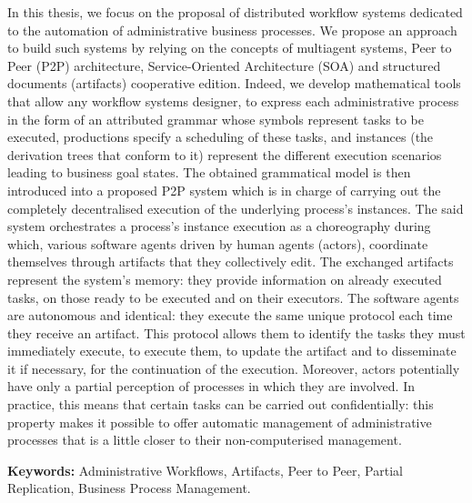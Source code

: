 \let\oldprintchaptertitle=\printchaptertitle
\renewcommand{\printchaptertitle}[1]{%
	\vspace*{-75pt}
	\oldprintchaptertitle{#1}
}%
\let\printchaptertitle=\oldprintchaptertitle
In this thesis, we focus on the proposal of distributed workflow systems dedicated to the automation of administrative business processes. We propose an approach to build such systems by relying on the concepts of multiagent systems, Peer to Peer (P2P) architecture, Service-Oriented Architecture (SOA) and structured documents (artifacts) cooperative edition. 
Indeed, we develop mathematical tools that allow any workflow systems designer, to express each administrative process in the form of an attributed grammar whose symbols represent tasks to be executed, productions specify a scheduling of these tasks, and instances (the derivation trees that conform to it) represent the different execution scenarios leading to business goal states. The obtained grammatical model is then introduced into a proposed P2P system which is in charge of carrying out the completely decentralised execution of the underlying process's instances. 
The said system orchestrates a process's instance execution as a choreography during which, various software agents driven by human agents (actors), coordinate themselves through artifacts that they collectively edit. The exchanged artifacts represent the system's memory: they provide information on already executed tasks, on those ready to be executed and on their executors. The software agents are autonomous and identical: they execute the same unique protocol each time they receive an artifact. This protocol allows them to identify the tasks they must immediately execute, to execute them, to update the artifact and to disseminate it if necessary, for the continuation of the execution. 
Moreover, actors potentially have only a partial perception of processes in which they are involved. In practice, this means that certain tasks can be carried out confidentially: this property makes it possible to offer automatic management of administrative processes that is a little closer to their non-computerised management.

\vspace{1cm}
\noindent\textbf{Keywords:} Administrative Workflows, Artifacts, Peer to Peer, Partial Replication, Business Process Management.


\myCleanStarChapterEnd

